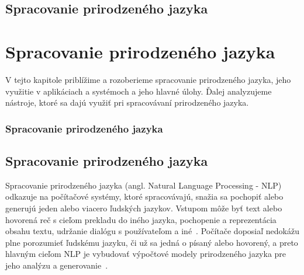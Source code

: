 \newpage
%
%
{
	\section{Spracovanie prirodzeného jazyka} 
}
{
	\chapter{Spracovanie prirodzeného jazyka}
}
V tejto kapitole priblížime a rozoberieme spracovanie prirodzeného jazyka, jeho využitie v aplikáciach a systémoch a jeho hlavné úlohy. Ďalej analyzujeme nástroje, ktoré sa dajú využiť pri spracovávaní prirodzeného jazyka.

%
%
{
	\subsection{Spracovanie prirodzeného jazyka}
}
{
	\section{Spracovanie prirodzeného jazyka}
}
\label{subsec:nlp}
Spracovanie prirodzeného jazyka (angl. Natural Language Processing - NLP) odkazuje na počítačové systémy, ktoré spracovávajú, snažia sa pochopiť alebo generujú jeden alebo viacero ľudských jazykov. Vstupom môže byť text alebo hovorená reč s cieľom prekladu do iného jazyka, pochopenie a reprezentácia obsahu textu, udržanie dialógu s používateľom a iné~\cite{AllenNLP}. Počítače doposiaľ nedokážu plne porozumieť ľudskému jazyku, či už sa jedná o písaný alebo hovorený, a preto hlavným cieľom NLP je vybudovať výpočtové modely prirodzeného jazyka pre jeho analýzu a generovanie~\cite{Bharati1995}.

